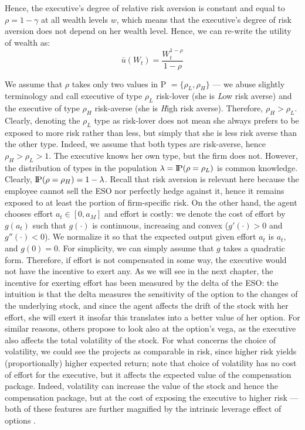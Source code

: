 Hence, the executive's degree of relative risk aversion is constant and equal to $\rho = 1-\gamma$ at all wealth levels $w$, which means that the executive's degree of risk aversion does not depend on her wealth level. Hence, we can re-write the utility of wealth as:
$$ \bar{u}(W_t) = \frac{W_t^{1-\rho}}{1-\rho} $$

We assume that $\rho$ takes only two values in P $= \{\rho_L, \rho_H \}$ --- we abuse slightly terminology and call executive of type $\rho_L$ risk-lover (she is \textit{L}ow risk averse) and the executive of type $\rho_H$ risk-averse (she is \textit{H}igh risk averse). Therefore, $\rho_H > \rho_L$. Clearly, denoting the $\rho_L$ type as risk-lover does not mean she always prefers to be exposed to more risk rather than less, but simply that she is less risk averse than the other type. Indeed, we assume that both types are risk-averse, hence $\rho_H > \rho_L > 1$. The executive knows her own type, but the firm does not. However, the distribution of types in the population $\lambda = \text{I\kern-0.15em P}(\rho = \rho_L)$ is common knowledge. Clearly, $\text{I\kern-0.15em P}(\rho = \rho_H) = 1 - \lambda$. Recall that risk aversion is relevant here because the employee cannot sell the ESO nor perfectly hedge against it, hence it remains exposed to at least the portion of firm-specific risk.
On the other hand, the agent chooses effort $a_t \in [0, a_M]$ and effort is costly: we denote the cost of effort by $g(a_t)$ such that $g(\cdot)$ is continuous, increasing and convex ($g'(\cdot) > 0$ and $g''(\cdot)<0$). We normalize it so that the expected output given effort $a_t$ is $a_t$, and $g(0) = 0$. For simplicity, we can simply assume that $g$ takes a quadratic form. Therefore, if effort is not compensated in some way, the executive would not have the incentive to exert any. 
As we will see in the next chapter, the incentive for exerting effort has been measured by the delta of the ESO: the intuition is that the delta measures the sensitivity of the option to the changes of the underlying stock, and since the agent affects the drift of the stock with her effort, she will exert it insofar this translates into a better value of her option. For similar reasons, others propose to look also at the option's vega, as the executive also affects the total volatility of the stock. For what concerns the choice of volatility, we could see the projects as comparable in risk, since higher risk yields (proportionally) higher expected return; note that choice of volatility has no cost of effort for the executive, but it affects the expected value of the compensation package. Indeed, volatility can increase the value of the stock and hence the compensation package, but at the cost of exposing the executive to higher risk --- both of these features are further magnified by the intrinsic leverage effect of options \cite{cadenillas2005executive}.

